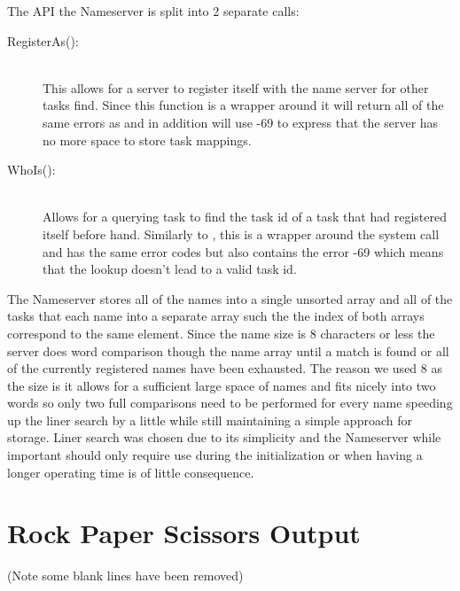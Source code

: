 \documentclass[pdftex,10pt,a4paper]{article}
\begin{document}
The API the Nameserver is split into 2 separate calls:
\begin{description}
\item[RegisterAs():] \hfill \\
This allows for a server to register itself with the name server for other tasks
find. Since this function is a wrapper around  it will return all of
the same errors as  and in addition will use -69 to express that the
server has no more space to store task mappings.

\item[WhoIs():] \hfill \\
Allows for a querying task to find the task id of a task that had registered
itself before hand. Similarly to , this is a wrapper around
the  system call and has the same error codes but also contains
the error -69 which means that the lookup doesn’t lead to a valid task id.
\end{description}

The Nameserver stores all of the names into a single unsorted array and all of
the tasks that each name into a separate array such the the index of both arrays
correspond to the same element. Since the name size is 8 characters or less the
server does word comparison though the name array until a match is found or all
of the currently registered names have been exhausted. The reason we used 8 as
the size is it allows for a sufficient large space of names and fits nicely into
two words so only two full comparisons need to be performed for every name
speeding up the liner search by a little while still maintaining a simple approach
for storage. Liner search was chosen due to its simplicity and the Nameserver
while important should only require use during the initialization or when having
a longer operating time is of little consequence.


\section*{Rock Paper Scissors Output}



(Note some blank lines have been removed)
\end{document}
